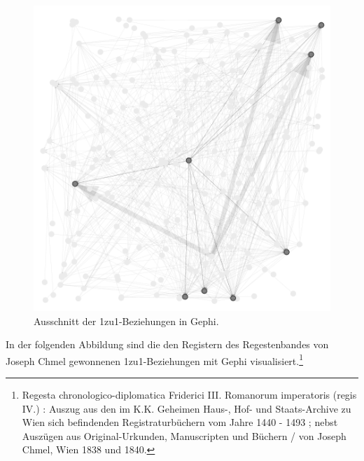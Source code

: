 \documentclass[ngerman,]{scrreprt}
\begin{document}
\begin{figure}
\centering
\includegraphics{Bilder/Gephi-Register.png}
\caption{Ausschnitt der 1zu1-Beziehungen in Gephi.}
\end{figure}

In der folgenden Abbildung sind die den Registern des Regestenbandes von Joseph Chmel gewonnenen 1zu1-Beziehungen mit Gephi visualisiert.\footnote{Regesta chronologico-diplomatica Friderici III. Romanorum imperatoris (regis IV.) : Auszug aus den im K.K. Geheimen Haus-, Hof- und Staats-Archive zu Wien sich befindenden Registraturbüchern vom Jahre 1440 - 1493 ; nebst Auszügen aus Original-Urkunden, Manuscripten und Büchern / von Joseph Chmel, Wien 1838 und 1840.}
\end{document}
